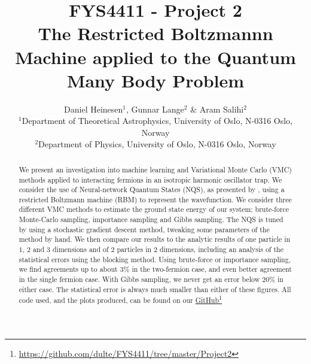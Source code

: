 \documentclass[a4paper, 10pt]{article}
\title{FYS4411 - Project 2\\
	The Restricted Boltzmannn Machine applied to the Quantum Many Body Problem}
\author{Daniel Heinesen$^1$, Gunnar Lange$^2$ \& Aram Salihi$^2$\\
	\small $^1$Department of Theoretical Astrophysics, University of Oslo, N-0316 Oslo, Norway\\
	\small $^2$Department of Physics, University of Oslo, N-0316 Oslo, Norway}
\begin{document}
	\maketitle
	\begin{abstract}
	\begin{center}
	We present an investigation into machine learning and Variational Monte Carlo (VMC) methods applied to interacting fermions in an isotropic harmonic oscillator trap. We consider the use of Neural-network Quantum States (NQS), as presented by \cite{Carleo602}, using a restricted Boltzmann machine (RBM) to represent the wavefunction. We consider three different VMC methods to estimate the ground state energy of our system; brute-force Monte-Carlo sampling, importance sampling and Gibbs sampling. The NQS is tuned by using a stochastic gradient descent method, tweaking some parameters of the method by hand. We then compare our results to the analytic results of one particle in $1$, $2$ and $3$ dimensions and of $2$ particles in $2$ dimensions, including an analysis of the statistical errors using the blocking method. Using brute-force or importance sampling, we find agreements up to about $3\%$ in the two-fermion case, and even better agreement in the single fermion case. With Gibbs sampling, we never get an error below $20\%$ in either case. The statistical error is always much smaller than either of these figures. All code used, and the plots produced, can be found on our \href{https://github.com/dulte/FYS4411/tree/master/Project2}{GitHub}\footnote{\url{https://github.com/dulte/FYS4411/tree/master/Project2}}
\end{center}
	\end{abstract}
	\newpage
	\tableofcontents
	\newpage
\end{document}
